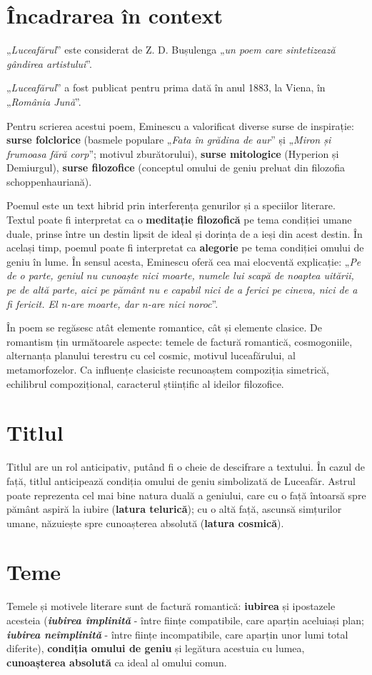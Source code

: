 \documentclass{article}
\newcommand{\qu}[1]{„\emph{#1}”}
\begin{document}
\section{Încadrarea în context}
\qu{Luceafărul} este considerat de Z. D. Bușulenga \qu{un poem care sintetizează gândirea artistului}.

\qu{Luceafărul} a fost publicat pentru prima dată în anul 1883, la Viena, în \qu{România Jună}.

Pentru scrierea acestui poem, Eminescu a valorificat diverse surse de inspirație: \textbf{surse folclorice} (basmele populare \qu{Fata în grădina de aur} și \qu{Miron și frumoasa fără corp}; motivul zburătorului), \textbf{surse mitologice} (Hyperion și Demiurgul), \textbf{surse filozofice} (conceptul omului de geniu preluat din filozofia schoppenhauriană).

Poemul este un text hibrid prin interferența genurilor și a speciilor literare. Textul poate fi interpretat ca o \textbf{meditație filozofică} pe tema condiției umane duale, prinse între un destin lipsit de ideal și dorința de a ieși din acest destin. În același timp, poemul poate fi interpretat ca \textbf{alegorie} pe tema condiției omului de geniu în lume. În sensul acesta, Eminescu oferă cea mai elocventă explicație: \qu{Pe de o parte, geniul nu cunoaște nici moarte, numele lui scapă de noaptea uitării, pe de altă parte, aici pe pământ nu e capabil nici de a ferici pe cineva, nici de a fi fericit. El n-are moarte, dar n-are nici noroc}.

În poem se regăsesc atât elemente romantice, cât și elemente clasice. De romantism țin următoarele aspecte: temele de factură romantică, cosmogoniile, alternanța planului terestru cu cel cosmic, motivul luceafărului, al metamorfozelor. Ca influențe clasiciste recunoaștem compoziția simetrică, echilibrul compozițional, caracterul științific al ideilor filozofice.
\section{Titlul}
Titlul are un rol anticipativ, putând fi o cheie de descifrare a textului. În cazul de față, titlul anticipează condiția omului de geniu simbolizată de Luceafăr. Astrul poate reprezenta cel mai bine natura duală a geniului, care cu o față întoarsă spre pământ aspiră la iubire (\textbf{latura telurică}); cu o altă față, ascunsă simțurilor umane, năzuiește spre cunoașterea absolută (\textbf{latura cosmică}).

\section{Teme}
Temele și motivele literare sunt de factură romantică: \textbf{iubirea} și ipostazele acesteia (\textsl{\textbf{iubirea împlinită}} - între ființe compatibile, care aparțin aceluiași plan; \textsl{\textbf{iubirea neîmplinită}} - între ființe incompatibile, care aparțin unor lumi total diferite), \textbf{condiția omului de geniu} și legătura acestuia cu lumea, \textbf{cunoașterea absolută} ca ideal al omului comun.
\end{document}
